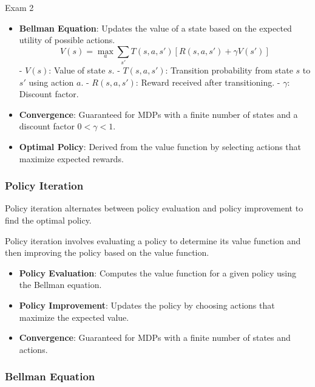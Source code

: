 \begin{examnotes}{Exam 2}
\begin{highlight}
        \begin{itemize}
            \item \textbf{Bellman Equation}: Updates the value of a state based on the expected utility of possible actions.
                \[
                V(s) = \max_{a} \sum_{s'} T(s, a, s') \left[ R(s, a, s') + \gamma V(s') \right]
                \]
                - \(V(s)\): Value of state \(s\).
                - \(T(s, a, s')\): Transition probability from state \(s\) to \(s'\) using action \(a\).
                - \(R(s, a, s')\): Reward received after transitioning.
                - \(\gamma\): Discount factor.
            \item \textbf{Convergence}: Guaranteed for MDPs with a finite number of states and a discount factor \(0 < \gamma < 1\).
            \item \textbf{Optimal Policy}: Derived from the value function by selecting actions that maximize expected rewards.
        \end{itemize}
    \end{highlight}
    
    \subsubsection*{Policy Iteration}
    
    Policy iteration alternates between policy evaluation and policy improvement to find the optimal policy.
    
    \begin{highlight}
        Policy iteration involves evaluating a policy to determine its value function and then improving the policy based on the value function.
        
        \begin{itemize}
            \item \textbf{Policy Evaluation}: Computes the value function for a given policy using the Bellman equation.
            \item \textbf{Policy Improvement}: Updates the policy by choosing actions that maximize the expected value.
            \item \textbf{Convergence}: Guaranteed for MDPs with a finite number of states and actions.
        \end{itemize}
    \end{highlight}
    
    \subsubsection*{Bellman Equation}
    

\end{examnotes}
